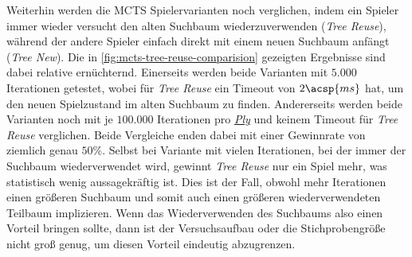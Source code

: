 Weiterhin werden die \ac{MCTS} Spielervarianten noch verglichen, indem ein Spieler immer wieder versucht den alten Suchbaum wiederzuverwenden (\emph{Tree Reuse}), während der andere Spieler einfach direkt mit einem neuen Suchbaum anfängt (\emph{Tree New}). Die in \ref{fig:mcts-tree-reuse-comparision} gezeigten Ergebnisse sind dabei relative ernüchternd. Einerseits werden beide Varianten mit $5{.}000$ Iterationen getestet, wobei für \emph{Tree Reuse} ein Timeout von $2\acsp{ms}$ hat, um den neuen Spielzustand im alten Suchbaum zu finden. Andererseits werden beide Varianten noch mit je $100{.}000$ Iterationen pro \hyperref[text:ply]{\emph{Ply}} und keinem Timeout für \emph{Tree Reuse} verglichen. Beide Vergleiche enden dabei mit einer Gewinnrate von ziemlich genau $50\%$. Selbst bei Variante mit vielen Iterationen, bei der immer der Suchbaum wiederverwendet wird, gewinnt \emph{Tree Reuse} nur ein Spiel mehr, was statistisch wenig aussagekräftig ist. Dies ist der Fall, obwohl mehr Iterationen einen größeren Suchbaum und somit auch einen größeren wiederverwendeten Teilbaum implizieren. Wenn das Wiederverwenden des Suchbaums also einen Vorteil bringen sollte, dann ist der Versuchsaufbau oder die Stichprobengröße nicht groß genug, um diesen Vorteil eindeutig abzugrenzen.


